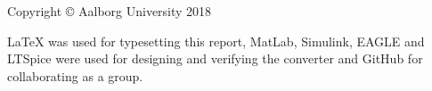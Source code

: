 \thispagestyle{empty}
{\small
\strut\vfill %
\noindent Copyright \copyright{} Aalborg University 2018\par
\vspace{0.2cm}
\noindent \LaTeX \: was used for typesetting this report,
MatLab, Simulink, EAGLE and LTSpice were used for designing and verifying the converter and
GitHub \cite{GitHub} for collaborating as a group.
}
\clearpage